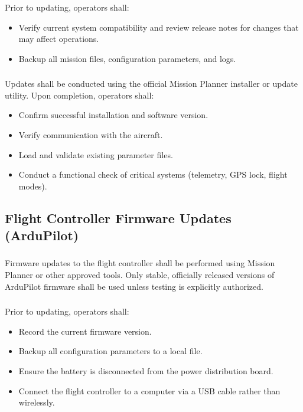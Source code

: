         \subsubsection{} Prior to updating, operators shall:
        \begin{itemize}
            \item Verify current system compatibility and review release notes for changes that may affect operations.
            \item Backup all mission files, configuration parameters, and logs.
        \end{itemize}
        
        \subsubsection{} Updates shall be conducted using the official Mission Planner installer or update utility. Upon completion, operators shall:
        \begin{itemize}
            \item Confirm successful installation and software version.
            \item Verify communication with the aircraft.
            \item Load and validate existing parameter files.
            \item Conduct a functional check of critical systems (telemetry, GPS lock, flight modes).
        \end{itemize}
    
    \subsection{Flight Controller Firmware Updates (ArduPilot)}
    
        \subsubsection{} Firmware updates to the flight controller shall be performed using Mission Planner or other approved tools. Only stable, officially released versions of ArduPilot firmware shall be used unless testing is explicitly authorized.
        
        \subsubsection{} Prior to updating, operators shall:
        \begin{itemize}
            \item Record the current firmware version.
            \item Backup all configuration parameters to a local file.
            \item Ensure the battery is disconnected from the power distribution board.
            \item Connect the flight controller to a computer via a USB cable rather than wirelessly.
        \end{itemize}
        
